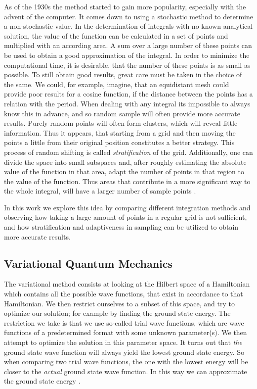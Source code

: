 As of the 1930s the method started to gain more popularity, especially with the advent of the computer. It comes down to using a stochastic method to determine a non-stochastic value.
In the determination of integrals with no known analytical solution, the value of the function can be calculated in a set of points and multiplied with an according area. A sum over a large number of these points can be used to obtain a good approximation of the integral. In order to minimize the computational time, it is desirable, that the number of these points is as small as possible. To still obtain good results, great care must be taken in the choice of the same. We could, for example, imagine, that an equidistant mesh could provide poor results for a cosine function, if the distance between the points has a relation with the period. When dealing with any integral its impossible to always know this in advance,
and so random sample will often provide more accurate results. Purely random points will often form clusters, which will reveal little information. Thus it appears, that starting from a grid and then moving the points a little from their original position constitutes a better strategy. This process of random shifting is called \textit{stratification} of the grid. Additionally, one can divide the space into small subspaces and, after roughly estimating the absolute value of the function in that area, adapt the number of points in that region to the value of the function. Thus areas that contribute in a more significant way to the whole integral, will have a larger number of sample points \cite{MCmethods}.

In this work we explore this idea by comparing different integration methods and observing how taking a large amount of points in a regular grid is not sufficient, and how stratification and adaptiveness in sampling can be utilized to obtain more accurate results.

\subsection{Variational Quantum Mechanics}
The variational method consists at looking at the Hilbert space of a Hamiltonian which contains all the possible wave functions,
that exist in accordance to that Hamiltonian. We then restrict ourselves to a subset of this space,
and try to optimize our solution; for example by finding the ground state energy. The restriction we take is that
we use so-called trial wave functions, which are wave functions of a predetermined format with some unknown parameter(s).
We then attempt to optimize the solution in this parameter space. It turns out that \textit{the} ground state wave function
will always yield the lowest ground state energy. So when comparing two trial wave functions, the one with the lowest
energy will be closer to the \textit{actual} ground state wave function. In this way we can approximate the ground state
energy \cite{AdvStatMech}.


